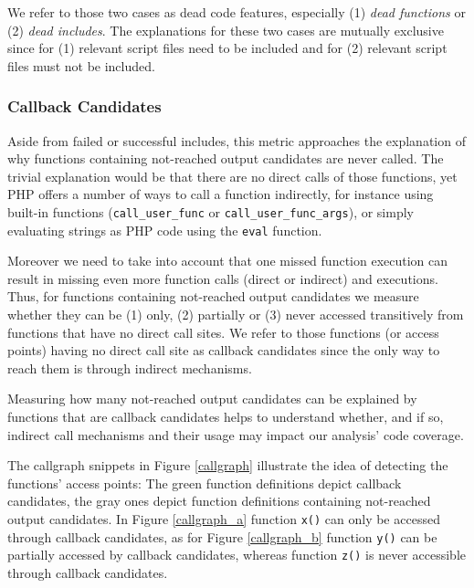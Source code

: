 \documentclass[preprint]{sig-alternate-05-2015}
\begin{document}
We refer to those two cases as dead code features, especially (1) \emph{dead functions} or (2) \emph{dead includes}. The explanations for these two cases are mutually exclusive since for (1) relevant script files need to be included and for (2) relevant script files must not be included.

\subsubsection{Callback Candidates} \label{callback_candidate_section}
Aside from failed or successful includes, this metric approaches the explanation of why functions containing not-reached output candidates are never called. The trivial explanation would be that there are no direct calls of those functions, yet PHP offers a number of ways to call a function indirectly, for instance using built-in functions (\texttt{call\_user\_func} or \texttt{call\_user\_func\_args}), or simply evaluating strings as PHP code using the \texttt{eval} function. 

Moreover we need to take into account that one missed function execution can result in missing even more function calls (direct or indirect) and executions. Thus, for functions containing not-reached output candidates we measure whether they can be (1) only, (2) partially or (3) never accessed transitively from functions that have no direct call sites. We refer to those functions (or access points) having no direct call site as callback candidates since the only way to reach them is through indirect mechanisms.

Measuring how many not-reached output candidates can be explained by functions that are callback candidates helps to understand whether, and if so, indirect call mechanisms and their usage may impact our analysis' code coverage.

The callgraph snippets in Figure \ref{callgraph} illustrate the idea of detecting the functions' access points: The green function definitions depict callback candidates, the gray ones depict function definitions containing not-reached output candidates. In Figure \ref{callgraph_a} function \texttt{x()} can only be accessed through callback candidates, as for Figure \ref{callgraph_b} function \texttt{y()} can be partially accessed by callback candidates, whereas function \texttt{z()} is never accessible through callback candidates.
\end{document}
